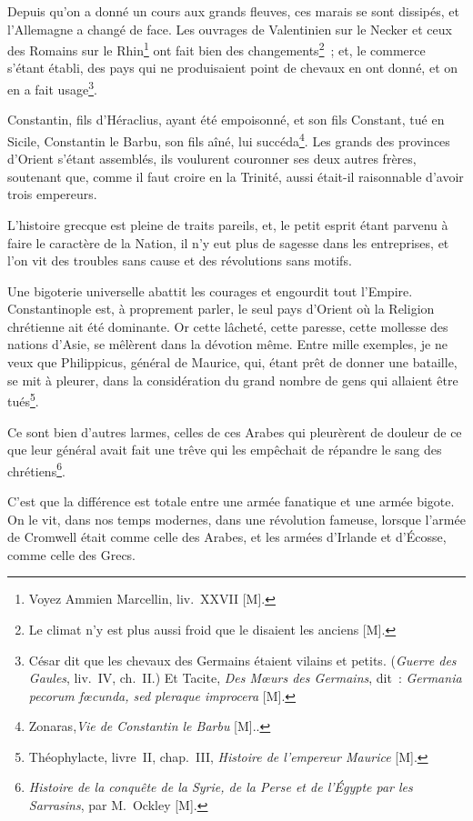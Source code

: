 \documentclass[french,twoside]{book} %
\begin{document}
Depuis qu’on a donné un cours aux grands fleuves, ces marais se sont dissipés, et l’Allemagne a changé de face. Les ouvrages de Valentinien sur le Necker et ceux des Romains sur le Rhin\footnote{Voyez Ammien Marcellin, liv. XXVII [M].} ont fait bien des changements\footnote{Le climat n’y est plus aussi froid que le disaient les anciens [M].} ; et, le commerce s’étant établi, des pays qui ne produisaient point de chevaux en ont donné, et on en a fait usage\footnote{César dit que les chevaux des Germains étaient vilains et petits. ({\itshape Guerre des Gaules}, liv. IV, ch. II.) Et Tacite, {\itshape Des Mœurs des Germains}, dit : {\itshape Germania pecorum fœcunda, sed pleraque improcera} [M].}.\par
Constantin, fils d’Héraclius, ayant été empoisonné, et son fils Constant, tué en Sicile, Constantin le Barbu, son fils aîné, lui succéda\footnote{Zonaras,{\itshape  Vie de Constantin le Barbu} [M]..}. Les grands des provinces d’Orient s’étant assemblés, ils voulurent couronner ses deux autres frères, soutenant que, comme il faut croire en la Trinité, aussi était-il raisonnable d’avoir trois empereurs.\par
L’histoire grecque est pleine de traits pareils, et, le petit esprit étant parvenu à faire le caractère de la Nation, il n’y eut plus de sagesse dans les entreprises, et l’on vit des troubles sans cause et des révolutions sans motifs.\par
Une bigoterie universelle abattit les courages et engourdit tout l’Empire. Constantinople est, à proprement parler, le seul pays d’Orient où la Religion chrétienne ait été dominante. Or cette lâcheté, cette paresse, cette mollesse des nations d’Asie, se mêlèrent dans la dévotion même. Entre mille exemples, je ne veux que Philippicus, général de Maurice, qui, étant prêt de donner une bataille, se mit à pleurer, dans la considération du grand nombre de gens qui allaient être tués\footnote{Théophylacte, livre II, chap. III, {\itshape Histoire de l’empereur Maurice} [M].}.\par
Ce sont bien d’autres larmes, celles de ces Arabes qui pleurèrent de douleur de ce que leur général avait fait une trêve qui les empêchait de répandre le sang des chrétiens\footnote{{\itshape Histoire de la conquête de la Syrie, de la Perse et de l’Égypte par les Sarrasins}, par M. Ockley [M].}.\par
C’est que la différence est totale entre une armée fanatique et une armée bigote. On le vit, dans nos temps modernes, dans une révolution fameuse, lorsque l’armée de Cromwell était comme celle des Arabes, et les armées d’Irlande et d’Écosse, comme celle des Grecs.\par
\end{document}
